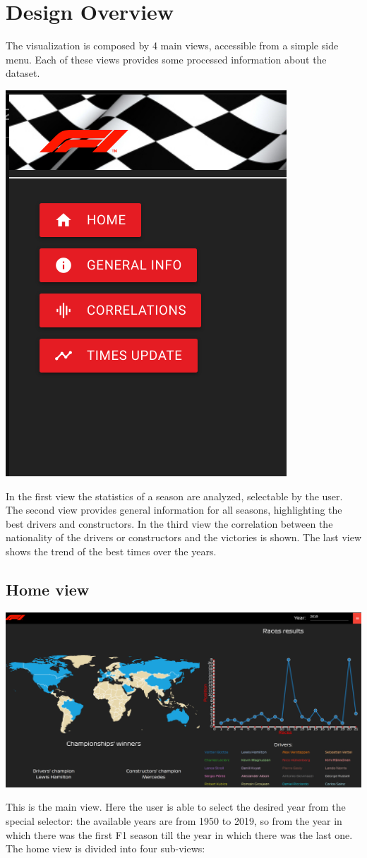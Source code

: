 \documentclass[10pt,twocolumn,letterpaper]{article}
\begin{document}
\section{Design Overview}
The visualization is composed by 4 main views, accessible from a simple side menu. Each of these views provides some processed information about the dataset.
\begin{center}
	\centering
	\includegraphics[width=0.3\columnwidth]{menu}
\end{center}
In the first view the statistics of a season are analyzed, selectable by the user. The second view provides general information for all seasons, highlighting the best drivers and constructors. In the third view the correlation between the nationality of the drivers or constructors and the victories is shown.  The last view shows the trend of the best times over the years.

\subsection{Home view}
\begin{center}
	\centering
	\includegraphics[width=\columnwidth]{home}
\end{center}

This is the main view. Here the user is able to select the desired year from the special selector: the available years are from 1950 to 2019, so from the year in which there was
the first F1 season till the year in which there was the last one. The home view is divided into four sub-views:
\end{document}
